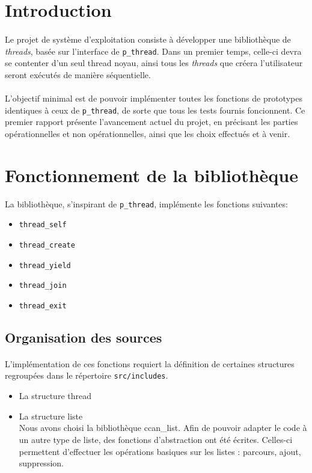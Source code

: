 \documentclass[a4paper]{article}
\begin{document}


\newpage


\section*{Introduction}

\paragraph{}
Le projet de système d'exploitation consiste à développer une bibliothèque de \emph{threads}, basée sur l'interface de \texttt{p\_thread}. Dans un premier temps, celle-ci devra se contenter d'un seul thread noyau, ainsi tous les \emph{threads} que créera l'utilisateur seront exécutés de manière séquentielle. 

\paragraph{}
L'objectif minimal est de pouvoir implémenter toutes les fonctions de prototypes identiques à ceux de \texttt{p\_thread}, de sorte que tous les tests fournis foncionnent. Ce premier rapport présente l'avancement actuel du projet, en précisant les parties opérationnelles et non opérationnelles, ainsi que les choix effectués et à venir.

\section{Fonctionnement de la bibliothèque}
La bibliothèque, s'inspirant de \texttt{p\_thread}, implémente les fonctions suivantes:
\begin{itemize}
  \item \texttt{thread\_self}
  \item \texttt{thread\_create}
  \item \texttt{thread\_yield}
  \item \texttt{thread\_join}
  \item \texttt{thread\_exit}
\end{itemize}

\subsection{Organisation des sources}
\paragraph{}
L'implémentation de ces fonctions requiert la définition de certaines structures regroupées dans le répertoire \texttt{src/includes}. 
\begin{itemize}
\item La structure thread
\item La structure liste \\
Nous avons choisi la bibliothèque ccan\_list. Afin de pouvoir adapter le code à un autre type de liste, des fonctions d'abstraction ont été écrites. Celles-ci permettent d'effectuer les opérations basiques sur les listes : parcours, ajout, suppression.
\end{itemize}
\end{document}
